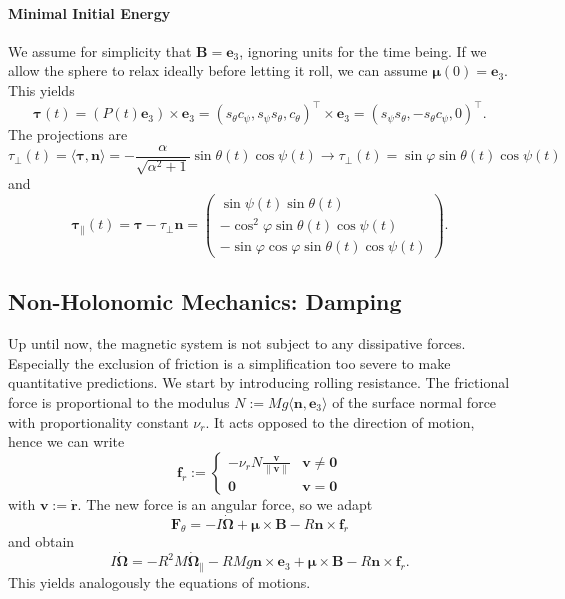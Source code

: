\paragraph*{Minimal Initial Energy}
We assume for simplicity that $\bm{B}=\bm{e}_3$, ignoring units for the time being. If we allow the sphere to relax ideally before letting it roll, we can assume $\bm{\mu}(0)=\bm{e}_3$. This yields \[
    \bm{\tau}(t)=(P(t)\bm{e}_3) \times \bm{e}_3 = (s_\theta c_\psi, s_\psi s_\theta, c_\theta)^\top \times \bm{e}_3 = (s_\psi s_\theta, -s_\theta c_\psi, 0)^\top
.\] 
The projections are
\[
    \tau_\perp(t) = \langle \bm{\tau},\bm{n}  \rangle = -\frac{\alpha}{\sqrt{\alpha^2 +1}}\sin \theta(t) \cos \psi(t) \rightarrow \tau_\perp(t)= \sin \varphi \sin \theta(t) \cos \psi(t)
\] 
and
\[
    \bm{\tau}_\|(t)= \bm{\tau}-\tau_\perp \bm{n}=
    \begin{pmatrix}
    \sin \psi(t) \sin \theta(t)\\ - \cos^2 \varphi \sin \theta(t) \cos \psi(t)\\ -\sin \varphi \cos \varphi \sin \theta(t) \cos \psi(t)
\end{pmatrix}
.\] 
\subsection{Non-Holonomic Mechanics: Damping}
Up until now, the magnetic system is not subject to any dissipative forces. Especially the exclusion of friction is a simplification too severe to make quantitative predictions. We start by introducing rolling resistance. The frictional force is proportional to the modulus $N:=Mg\langle \bm{n},\bm{e}_3 \rangle$ of the surface normal force with proportionality constant $\nu_r$. It acts opposed to the direction of motion, hence we can write 
\[
    \bm{f}_r:= 
    \begin{cases}
        - \nu_r N \frac{\bm{v}}{\|\bm{v}\|} &\bm{v}\neq \bm{0}\\
        \bm{0} &\bm{v}=\bm{0}
\end{cases}
    \] with $\bm{v}:=\dot{\bm{r}}$. The new force is an angular force, so we adapt \[
\bm{F}_\theta = -I\dot{\bm{\Omega}} + \bm{\mu} \times \bm{B} - R \bm{n} \times \bm{f}_r
\] and obtain
\[
    I \dot{\bm{\Omega}} = -R^2M \dot{\bm{\Omega}}_\| - RMg \bm{n} \times \bm{e}_3 + \bm{\mu} \times \bm{B} - R \bm{n} \times \bm{f}_r
.\] 
This yields analogously the equations of motions. 
